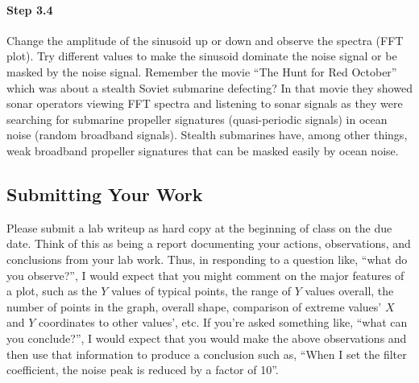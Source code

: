 \paragraph{Step 3.4} Change the amplitude of the sinusoid up or down
and observe the spectra (FFT plot). Try different values to make the
sinusoid dominate the noise signal or be masked by the noise
signal. Remember the movie ``The Hunt for Red October'' which was
about a stealth Soviet submarine defecting? In that movie they showed
sonar operators viewing FFT spectra and listening to sonar signals as
they were searching for submarine propeller signatures (quasi-periodic
signals) in ocean noise (random broadband signals). Stealth submarines
have, among other things, weak broadband propeller signatures that can
be masked easily by ocean noise.

\subsection{Submitting Your Work}

Please submit a lab writeup as hard copy at the beginning of class on
the due date. Think of this as being a report documenting your
actions, observations, and conclusions from your lab work. Thus, in
responding to a question like, ``what do you observe?'', I would
expect that you might comment on the major features of a plot, such as
the $Y$ values of typical points, the range of $Y$ values overall, the
number of points in the graph, overall shape, comparison of extreme
values' $X$ and $Y$ coordinates to other values', etc. If you're asked
something like, ``what can you conclude?'', I would expect that you
would make the above observations and then use that information to
produce a conclusion such as, ``When I set the filter coefficient, the
noise peak is reduced by a factor of 10''.

